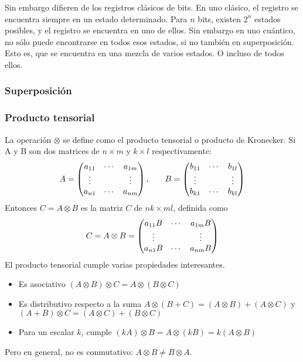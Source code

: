 Sin embargo difieren de los registros clásicos de bits. En uno clásico, el 
registro se encuentra siempre en un estado determinado. Para $n$ bits, existen 
$2^n$ estados posibles, y el registro se encuentra en uno de ellos. Sin embargo 
en uno cuántico, no sólo puede encontrarse en todos esos estados, si no también 
en superposición. Esto es, que se encuentra en una mezcla de varios estados. O 
incluso de todos ellos.

\subsubsection{Superposición}


\subsubsection{Producto tensorial}
\label{sss:producto-tensorial}

La operación $\otimes$ se define como el producto tensorial o producto de 
Kronecker. Si A y B son dos matrices de $n \times m$ y $k \times l$ 
respectivamente:
%
$$
\begin{array}{c c}
	A=\begin{pmatrix} 
		a_{11} & \cdots & a_{1m} \\
		\vdots &        & \vdots \\
		a_{n1} & \cdots & a_{nm}
	 \end{pmatrix}
	,\quad
	&
	B=\begin{pmatrix} 
		b_{11} & \cdots & b_{1l} \\
		\vdots &        & \vdots \\
		b_{k1} & \cdots & b_{kl}
	 \end{pmatrix}
\end{array}
$$
%
Entonces $C = A \otimes B$ es la matriz $C$ de $nk \times ml$, definida como
%
$$
C = A \otimes B=\begin{pmatrix} 
	a_{11} B & \cdots & a_{1m} B \\
	\vdots   &        & \vdots   \\
	a_{n1} B & \cdots & a_{nm} B
 \end{pmatrix}
$$
%
El producto tensorial cumple varias propiedades interesantes.
%
\begin{itemize}
\item Es asociativo $(A \otimes B) \otimes C = A \otimes (B \otimes C)$

\item Es distributivo respecto a la suma $A \otimes (B + C) = (A \otimes B) + (A
\otimes C) $ y $(A + B) \otimes C = (A \otimes C) + (B \otimes C)$

\item Para un escalar $k$, cumple $(kA) \otimes B = A \otimes (kB) = k (A 
\otimes B)$
\end{itemize}
%
Pero en general, no es conmutativo: $A \otimes B \neq B \otimes A$.





